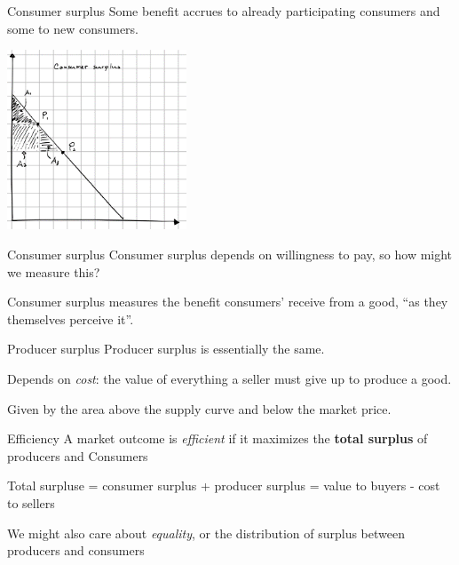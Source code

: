 \documentclass[aspectratio=169]{beamer}
\begin{document}
\begin{frame}{Consumer surplus}
    Some benefit accrues to already participating consumers and some to new consumers.

    \centering
    \includegraphics[width = 0.4\textwidth,keepaspectratio]{../figs/surplus2.png}
\end{frame}

\begin{frame}{Consumer surplus}
    Consumer surplus depends on willingness to pay, so how might we measure this?

    \vspace{5mm}

    Consumer surplus measures the benefit consumers' receive from a good, ``as they themselves perceive it''.
\end{frame}

\begin{frame}{Producer surplus}
    Producer surplus is essentially the same.
    
    \vspace{5mm}

    Depends on \textit{cost}: the value of everything a seller must give up to produce a good.

    \vspace{5mm}

    Given by the area above the supply curve and below the market price.
\end{frame}

\begin{frame}{Efficiency}
    A market outcome is \textit{efficient} if it maximizes the \textbf{total surplus} of producers and Consumers

    \vspace{2mm}

    Total surpluse = consumer surplus + producer surplus = value to buyers - cost to sellers

    \vspace{2mm}

    We might also care about \textit{equality}, or the distribution of surplus between producers and consumers

\end{frame}
\end{document}
